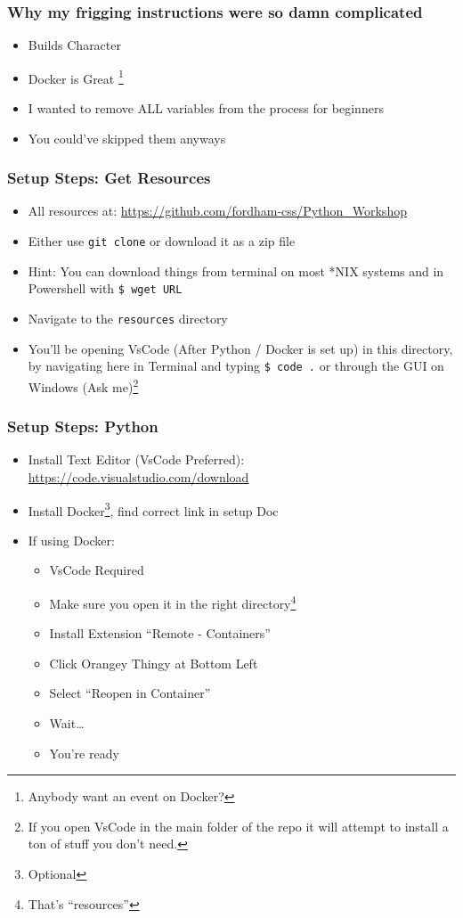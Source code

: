 \documentclass{beamer}
\begin{document}
\begin{frame}
  \frametitle{Why my frigging instructions were so damn complicated}
  \begin{itemize}
    \item Builds Character
    \pause
    \item Docker is Great
    \footnote{Anybody want an event on Docker?}
    \pause
    \item I wanted to remove ALL variables from the process for beginners
    \pause
    \item You could've skipped them anyways
  \end{itemize}
\end{frame}
\begin{frame}
  \frametitle{Setup Steps: Get Resources}
  \begin{itemize}
    \item All resources at: \url{https://github.com/fordham-css/Python_Workshop}
    \item Either use \texttt{git clone} or download it as a zip file
    \item Hint: You can download things from terminal on
          most *NIX systems and in Powershell with \texttt{\$ wget URL}
    \item Navigate to the \texttt{resources} directory
    \item You'll be opening VsCode (After Python / Docker is set up) in this directory,
          by navigating here in Terminal and typing \texttt{\$ code .} or through
          the GUI on Windows (Ask me)\footnote{If you open VsCode in the main folder
          of the repo it will attempt to install a ton of stuff you don't need.}
  \end{itemize}

\end{frame}
\begin{frame}
  \frametitle{Setup Steps: Python}
  \begin{itemize}
    \item Install Text Editor (VsCode Preferred): \url{https://code.visualstudio.com/download}
    \item Install Docker\footnote{Optional}, find correct link in setup Doc
    \pause
    \item If using Docker:
      \begin{itemize}
        \item VsCode Required
        \item Make sure you open it in the right directory\footnote{That's ``resources''}
        \item Install Extension ``Remote - Containers''
        \item Click Orangey Thingy at Bottom Left
        \item Select ``Reopen in Container''
        \item Wait\dots
        \item You're ready
      \end{itemize}
  \end{itemize}
\end{frame}
\end{document}
